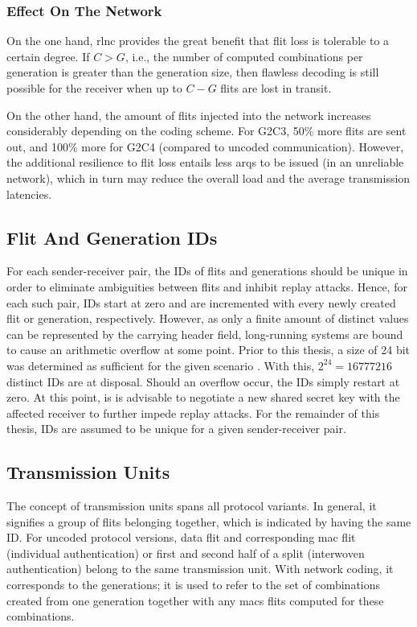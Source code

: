 \subsubsection{Effect On The Network}
On the one hand, \gls{rlnc} provides the great benefit that flit loss is tolerable to a certain degree. If $C > G$, i.e., the number of computed
combinations per generation is greater than the generation size, then flawless decoding is still possible for the receiver when up to $C - G$ flits
are lost in transit.

On the other hand, the amount of flits injected into the network increases considerably depending on the coding scheme. For G2C3, 50\% more flits are
sent out, and 100\% more for G2C4 (compared to uncoded communication). However, the additional resilience to flit loss entails less \glspl{arq} to be
issued (in an unreliable network), which in turn may reduce the overall load and the average transmission latencies.

\subsection{Flit And Generation IDs}\label{subsec:fidsandgids}
For each sender-receiver pair, the IDs of flits and generations should be unique in order to eliminate ambiguities between flits and inhibit replay
attacks. Hence, for each such pair, IDs start at zero and are incremented with every newly created flit or generation, respectively. However, as only a finite amount of
distinct values can be represented by the carrying header field, long-running systems are bound to cause an arithmetic overflow at some point. Prior
to this thesis, a size of 24 bit was determined as sufficient for the given scenario \cite[5]{franz18authdraft}. With this, $2^{24} = \num{16777216}$
distinct IDs are at disposal. Should an overflow occur, the IDs simply restart at zero. At this point, is is advisable to negotiate a new shared
secret key with the affected receiver to further impede replay attacks. For the remainder of this thesis, IDs are assumed to be unique for a given
sender-receiver pair.

\subsection{Transmission Units}
The concept of transmission units spans all protocol variants. In general, it signifies a group of flits belonging together, which is indicated by
having the same ID. For uncoded protocol versions, data flit and corresponding \gls{mac} flit (individual authentication) or first and second half of a
split (interwoven authentication) belong to the same transmission unit. With network coding, it corresponds to the generations; it is used to refer to
the set of combinations created from one generation together with any \glspl{mac} flits computed for these combinations.

